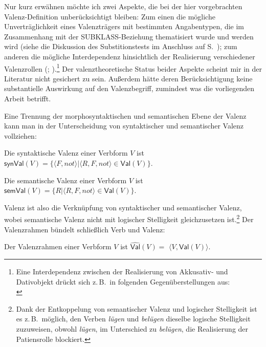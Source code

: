 Nur kurz erwähnen möchte ich zwei Aspekte, die bei der hier vorgebrachten Valenz-Defini\-tion unberücksichtigt bleiben: Zum einen die mögliche Unverträglichkeit eines Valenzträgers mit bestimmten Angabentypen, die im Zusammenhang mit der SUBKLASS-Bezie\-hung thematisiert wurde und werden wird (siehe die Diskussion des Substitionstests im Anschluss auf S.~\pageref{par-subsitutionstest}); zum anderen die mögliche Interdependenz hinsichtlich der Realisierung verschiedener Valenzrollen (\citealt[306ff]{Jacobs:94a}; \citealt[397f]{Jacobs:03}).\footnote{Eine Interdependenz zwischen der Realisierung von Akkusativ- und Dativobjekt drückt sich z.\,B.\ in folgenden Gegenüberstellungen aus:\\
} Der valenztheoretische Status beider Aspekte scheint mir in der Literatur nicht gesichert zu sein. Au\ss erdem hätte deren Berücksichtigung keine substantielle Auswirkung auf den Valenzbegriff, zumindest was die vorliegenden Arbeit betrifft.     

Eine Trennung der morphosyntaktischen und semantischen Ebene der Valenz kann man in der Unterscheidung von syntaktischer und semantischer Valenz vollziehen:  
\begin{definition}
Die syntaktische Valenz einer Verbform $V$ ist \linebreak $\mathsf{synVal}(V) = \{\langle F,not \rangle | \langle R,F,not \rangle \in \mathsf{Val}(V) \}$.
\end{definition}
\begin{definition}
Die semantische Valenz einer Verbform $V$ ist \linebreak $\mathsf{semVal}(V) = \{R | \langle R,F,not \rangle \in \mathsf{Val}(V) \}$.
\end{definition}

\newpage
Valenz ist also die Verknüpfung von syntaktischer und semantischer Valenz, wobei semantische Valenz nicht mit logischer Stelligkeit gleichzusetzen ist.\footnote{Dank der Entkoppelung von semantischer Valenz und logischer Stelligkeit ist es z.\,B.\ möglich, den Verben {\it lügen} und {\it belügen} dieselbe logische Stelligkeit zuzuweisen, obwohl {\it lügen}, im Unterschied zu {\it belügen}, die Realisierung der Patiensrolle blockiert.}  Der Valenzrahmen bündelt schlie\ss lich Verb und Valenz:
\begin{definition}[Valenzrahmen]
Der Valenzrahmen einer Verbform $V$ ist $\widehat{\mathsf{Val}}(V) =$ $\langle V, \mathsf{Val}(V) \rangle$.
\end{definition}

